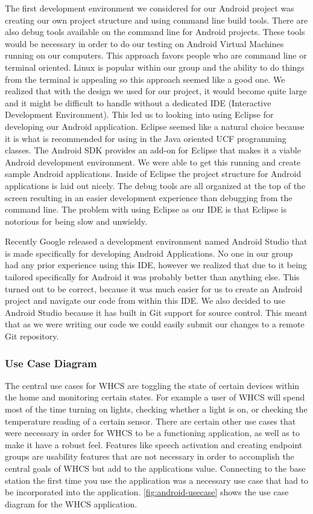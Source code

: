 The first development environment we considered for our Android project was
creating our own project structure and using command line build tools. There
are also debug tools available on the command line for Android projects. These
tools would be necessary in order to do our testing on Android Virtual Machines
running on our computers. This approach favors people who are command line or
terminal oriented. Linux is popular within our group and the ability to do
things from the terminal is appealing so this approach seemed like a good one.
We realized that with the design we used for our project, it would
become quite large and it might be difficult to handle without a dedicated IDE
(Interactive Development Environment). This led us to looking into using
Eclipse for developing our Android application. Eclipse seemed like a natural
choice because it is what is recommended for using in the Java oriented UCF
programming classes.  The Android SDK provides an add{}-on for Eclipse that
makes it a viable Android development environment. We were able to get this
running and create sample Android applications. Inside of Eclipse the project
structure for Android applications is laid out nicely. The debug tools are all
organized at the top of the screen resulting in an easier development
experience than debugging from the command line. The problem with using Eclipse
as our IDE is that Eclipse is notorious for being slow and unwieldy.

\color{black} Recently Google released a development environment named Android
Studio that is made specifically for developing Android Applications. No one in
our group had any prior experience using this IDE, however we realized that due
to it being tailored specifically for Android it was probably better than
anything else. This turned out to be correct, because it was much easier for us
to create an Android project and navigate our code from within this IDE. We
also decided to use Android Studio because it has built in Git support for
source control. This meant that as we were
writing our code we could easily submit our changes to a remote Git repository.

\subsubsection{Use Case Diagram} The central use cases for WHCS are toggling
the state of certain devices within the home and monitoring certain states.
For example a user of WHCS will spend most of the time turning on lights,
checking whether a light is on, or checking the temperature reading of a
certain sensor. There are certain other use cases that were necessary in order
for WHCS to be a functioning application, as well as to make it have a robust
feel. Features like speech activation and creating endpoint groups are
usability features that are not necessary in order to accomplish the central
goals of WHCS but add to the applications value.  Connecting to the base station the first time you use the
application was a necessary use case that had to be incorporated into the
application. \autoref{fig:android-usecase} shows the use case diagram for the
WHCS application.

